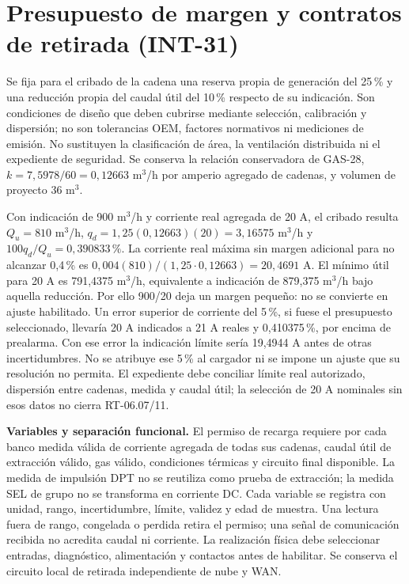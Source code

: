 \section{Presupuesto de margen y contratos de retirada (INT-31)}
\label{sec:sd4-integracion-seguridad31}
Se fija para el cribado de la cadena una reserva propia de generación del 25\,\% y una reducción propia del caudal útil del 10\,\% respecto de su indicación. Son condiciones de diseño que deben cubrirse mediante selección, calibración y dispersión; no son tolerancias OEM, factores normativos ni mediciones de emisión. No sustituyen la clasificación de área, la ventilación distribuida ni el expediente de seguridad. Se conserva la relación conservadora de GAS-28, $k=7,5978/60=0,12663$ m$^3$/h por amperio agregado de cadenas, y volumen de proyecto 36 m$^3$.

Con indicación de 900 m$^3$/h y corriente real agregada de 20 A, el cribado resulta $Q_u=810$ m$^3$/h, $q_d=1,25(0,12663)(20)=3,16575$ m$^3$/h y $100q_d/Q_u=0,390833\,\%$. La corriente real máxima sin margen adicional para no alcanzar 0,4\,\% es $0,004(810)/(1,25\cdot0,12663)=20,4691$ A. El mínimo útil para 20 A es 791,4375 m$^3$/h, equivalente a indicación de 879,375 m$^3$/h bajo aquella reducción. Por ello 900/20 deja un margen pequeño: no se convierte en ajuste habilitado. Un error superior de corriente del 5\,\%, si fuese el presupuesto seleccionado, llevaría 20 A indicados a 21 A reales y 0,410375\,\%, por encima de prealarma. Con ese error la indicación límite sería 19,4944 A antes de otras incertidumbres. No se atribuye ese 5\,\% al cargador ni se impone un ajuste que su resolución no permita. El expediente debe conciliar límite real autorizado, dispersión entre cadenas, medida y caudal útil; la selección de 20 A nominales sin esos datos no cierra RT-06.07/11.

\textbf{Variables y separación funcional.} El permiso de recarga requiere por cada banco medida válida de corriente agregada de todas sus cadenas, caudal útil de extracción válido, gas válido, condiciones térmicas y circuito final disponible. La medida de impulsión DPT no se reutiliza como prueba de extracción; la medida SEL de grupo no se transforma en corriente DC. Cada variable se registra con unidad, rango, incertidumbre, límite, validez y edad de muestra. Una lectura fuera de rango, congelada o perdida retira el permiso; una señal de comunicación recibida no acredita caudal ni corriente. La realización física debe seleccionar entradas, diagnóstico, alimentación y contactos antes de habilitar. Se conserva el circuito local de retirada independiente de nube y WAN.

